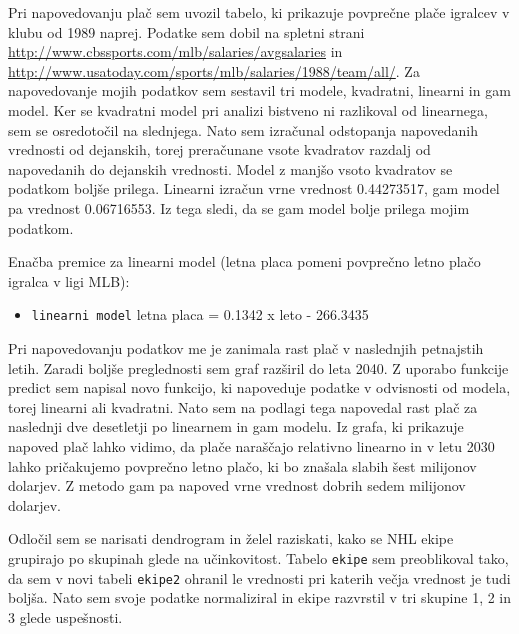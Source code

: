 \documentclass[11pt,a4paper]{article}
\begin{document}
Pri napovedovanju plač sem uvozil tabelo, ki prikazuje povprečne plače igralcev v klubu od 1989 naprej. Podatke sem dobil na spletni strani \url{http://www.cbssports.com/mlb/salaries/avgsalaries} in \url{http://www.usatoday.com/sports/mlb/salaries/1988/team/all/}.
Za napovedovanje mojih podatkov  sem sestavil tri modele, kvadratni, linearni in gam model. Ker se kvadratni model pri analizi bistveno ni razlikoval od linearnega, sem se osredotočil na slednjega. Nato sem izračunal odstopanja napovedanih vrednosti od dejanskih, torej preračunane vsote kvadratov razdalj od napovedanih do dejanskih vrednosti. Model z manjšo vsoto kvadratov se podatkom boljše prilega. Linearni izračun vrne vrednost 0.44273517, gam model pa vrednost 0.06716553. Iz tega sledi, da se gam model bolje prilega mojim podatkom.


Enačba premice za linearni model (letna placa pomeni povprečno letno plačo igralca v ligi MLB):
\begin{itemize}
\item{\verb|linearni model| letna placa = 0.1342 x leto - 266.3435}
\end{itemize}


Pri napovedovanju podatkov me je zanimala rast plač v naslednjih petnajstih letih. Zaradi boljše preglednosti sem graf razširil do leta 2040. Z uporabo funkcije predict sem napisal novo funkcijo, ki napoveduje podatke v odvisnosti od modela, torej linearni ali kvadratni. Nato sem na podlagi tega napovedal rast plač za naslednji dve desetletji po linearnem  in gam modelu. Iz grafa, ki prikazuje napoved plač lahko vidimo, da plače naraščajo relativno linearno in v letu 2030 lahko pričakujemo povprečno letno plačo, ki bo znašala slabih šest milijonov dolarjev. Z metodo gam pa napoved vrne vrednost dobrih sedem milijonov dolarjev.

 
Odločil sem se narisati dendrogram in želel raziskati, kako se NHL ekipe grupirajo po skupinah glede na učinkovitost. Tabelo \verb|ekipe| sem preoblikoval tako, da sem v novi tabeli \verb|ekipe2| ohranil le vrednosti pri katerih večja vrednost je tudi boljša. Nato sem svoje podatke normaliziral in ekipe razvrstil v tri skupine 1, 2 in 3 glede uspešnosti.

\end{document}
